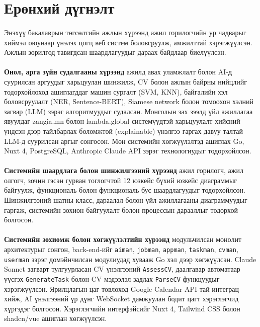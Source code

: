 
{}
\label{Summary} %
\section*{Ерөнхий дүгнэлт}

\paragraph{}
Энэхүү бакалаврын төгсөлтийн ажлын хүрээнд ажил горилогчийн ур чадварыг хиймэл оюунаар үнэлэх цогц веб систем боловсруулж, амжилттай хэрэгжүүлсэн. Ажлын зорилгод тавигдсан шаардлагуудыг дараах байдлаар биелүүлсэн.

\paragraph{}
\textbf{Онол, арга зүйн судалгааны хүрээнд} ажилд авах уламжлалт болон AI-д суурилсан аргуудыг харьцуулан шинжилж, CV болон ажлын байрны нийцлийг тодорхойлоход ашиглагддаг машин сургалт (SVM, KNN), байгалийн хэл боловсруулалт (NER, Sentence-BERT), Siamese network болон томоохон хэлний загвар (LLM) зэрэг алгоритмуудыг судалсан. Монголын зах зээлд үйл ажиллагаа явуулдаг zangia.mn болон lambda.global системүүдтэй харьцуулалт хийсний үндсэн дээр тайлбарлах боломжтой (explainable) үнэлгээ гаргах давуу талтай LLM-д суурилсан аргыг сонгосон. Мөн системийн хөгжүүлэлтэд ашиглах Go, Nuxt 4, PostgreSQL, Anthropic Claude API зэрэг технологиудыг тодорхойлсон.

\paragraph{}
\textbf{Системийн шаардлага болон шинжилгээний хүрээнд} ажил горилогч, ажил олгогч, зочин гэсэн гурван тоглогчтой 12 юзкейс бүхий юзкейс диаграммыг байгуулж, функциональ болон функциональ бус шаардлагуудыг тодорхойлсон. Шинжилгээний шатны класс, дараалал болон үйл ажиллагааны диаграммуудыг гаргаж, системийн зохион байгуулалт болон процессын дарааллыг тодорхой болгосон.

\paragraph{}
\textbf{Системийн зохиомж болон хөгжүүлэлтийн хүрээнд} модульчилсан монолит архитектурыг сонгон, back-end-ийг \texttt{aiman}, \texttt{jobman}, \texttt{appman}, \texttt{taskman}, \texttt{cvman}, \texttt{userman} зэрэг домэйнчилсан модулиудад хувааж Go хэл дээр хөгжүүлсэн. Claude Sonnet загварт тулгуурласан CV үнэлгээний \texttt{AssessCV}, даалгавар автоматаар үүсгэх \texttt{GenerateTask} болон CV мэдээлэл задлах \texttt{ParseCV} функцуудыг хэрэгжүүлсэн. Ярилцлагын цаг товлоход Google Calendar API-тай интеграц хийж, AI үнэлгээний үр дүнг WebSocket дамжуулан бодит цагт хэрэглэгчид хүргэдэг болгосон. Хэрэглэгчийн интерфэйсийг Nuxt 4, Tailwind CSS болон shadcn/vue ашиглан хөгжүүлсэн.

